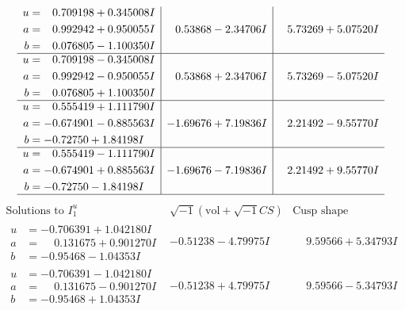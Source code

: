 \documentclass[1p]{elsarticle_modified}
\theoremstyle{definition}
\newcommand{\I}{\sqrt{-1}}
\begin{document}
$$\begin{array}{c|c|c}
\begin{aligned}
u &= \phantom{-}0.709198 + 0.345008 I \\
a &= \phantom{-}0.992942 + 0.950055 I \\
b &= \phantom{-}0.076805 - 1.100350 I\end{aligned}
 & \phantom{-}0.53868 - 2.34706 I & \phantom{-}5.73269 + 5.07520 I \\ \hline\begin{aligned}
u &= \phantom{-}0.709198 - 0.345008 I \\
a &= \phantom{-}0.992942 - 0.950055 I \\
b &= \phantom{-}0.076805 + 1.100350 I\end{aligned}
 & \phantom{-}0.53868 + 2.34706 I & \phantom{-}5.73269 - 5.07520 I \\ \hline\begin{aligned}
u &= \phantom{-}0.555419 + 1.111790 I \\
a &= -0.674901 - 0.885563 I \\
b &= -0.72750 + 1.84198 I\end{aligned}
 & -1.69676 + 7.19836 I & \phantom{-}2.21492 - 9.55770 I \\ \hline\begin{aligned}
u &= \phantom{-}0.555419 - 1.111790 I \\
a &= -0.674901 + 0.885563 I \\
b &= -0.72750 - 1.84198 I\end{aligned}
 & -1.69676 - 7.19836 I & \phantom{-}2.21492 + 9.55770 I\\
 \hline 
 \end{array}$$\newpage$$\begin{array}{c|c|c}  
\text{Solutions to }I^u_{1}& \I (\text{vol} + \sqrt{-1}CS) & \text{Cusp shape}\\
 \hline 
\begin{aligned}
u &= -0.706391 + 1.042180 I \\
a &= \phantom{-}0.131675 + 0.901270 I \\
b &= -0.95468 - 1.04353 I\end{aligned}
 & -0.51238 - 4.79975 I & \phantom{-}9.59566 + 5.34793 I \\ \hline\begin{aligned}
u &= -0.706391 - 1.042180 I \\
a &= \phantom{-}0.131675 - 0.901270 I \\
b &= -0.95468 + 1.04353 I\end{aligned}
 & -0.51238 + 4.79975 I & \phantom{-}9.59566 - 5.34793 I \\ \hline\begin{aligned}

\end{aligned}
\end{array}$$
\end{document}
